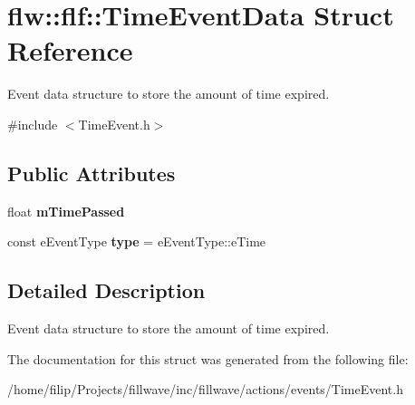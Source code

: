 \hypertarget{structflw_1_1flf_1_1TimeEventData}{}\section{flw\+:\+:flf\+:\+:Time\+Event\+Data Struct Reference}
\label{structflw_1_1flf_1_1TimeEventData}


Event data structure to store the amount of time expired.  




{\ttfamily \#include $<$Time\+Event.\+h$>$}

\subsection*{Public Attributes}
\begin{DoxyCompactItemize}
\item 
float {\bfseries m\+Time\+Passed}\hypertarget{structflw_1_1flf_1_1TimeEventData_abe2b686be320d6b7a9fd424fe37b7f62}{}\label{structflw_1_1flf_1_1TimeEventData_abe2b686be320d6b7a9fd424fe37b7f62}

\item 
const e\+Event\+Type {\bfseries type} = e\+Event\+Type\+::e\+Time\hypertarget{structflw_1_1flf_1_1TimeEventData_aa86c85b9344edc306ec8a03b33ad49c4}{}\label{structflw_1_1flf_1_1TimeEventData_aa86c85b9344edc306ec8a03b33ad49c4}

\end{DoxyCompactItemize}


\subsection{Detailed Description}
Event data structure to store the amount of time expired. 

The documentation for this struct was generated from the following file\+:\begin{DoxyCompactItemize}
\item 
/home/filip/\+Projects/fillwave/inc/fillwave/actions/events/Time\+Event.\+h\end{DoxyCompactItemize}
